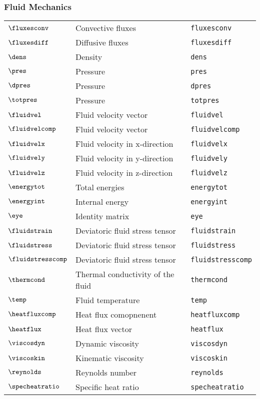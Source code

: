 \subsubsection*{Fluid Mechanics}
\begin{tabular}{l l l}
$\fluxesconv$ & Convective fluxes& \texttt{fluxesconv}\\
$\fluxesdiff$ & Diffusive fluxes& \texttt{fluxesdiff}\\
$\dens$ & Density& \texttt{dens}\\
$\pres$ & Pressure& \texttt{pres}\\
$\dpres$ & Pressure& \texttt{dpres}\\
$\totpres$ & Pressure& \texttt{totpres}\\
$\fluidvel$ & Fluid velocity vector& \texttt{fluidvel}\\
$\fluidvelcomp$ & Fluid velocity vector& \texttt{fluidvelcomp}\\
$\fluidvelx$ & Fluid velocity in x-direction& \texttt{fluidvelx}\\
$\fluidvely$ & Fluid velocity in y-direction& \texttt{fluidvely}\\
$\fluidvelz$ & Fluid velocity in z-direction& \texttt{fluidvelz}\\
$\energytot$ & Total energies& \texttt{energytot}\\
$\energyint$ & Internal energy& \texttt{energyint}\\
$\eye$ & Identity matrix& \texttt{eye}\\
$\fluidstrain$ & Deviatoric fluid stress tensor& \texttt{fluidstrain}\\
$\fluidstress$ & Deviatoric fluid stress tensor& \texttt{fluidstress}\\
$\fluidstresscomp$ & Deviatoric fluid stress tensor& \texttt{fluidstresscomp}\\
$\thermcond$ & Thermal conductivity of the fluid& \texttt{thermcond}\\
$\temp$ & Fluid temperature& \texttt{temp}\\
$\heatfluxcomp$ & Heat flux comopnenent& \texttt{heatfluxcomp}\\
$\heatflux$ & Heat flux vector& \texttt{heatflux}\\
$\viscosdyn$ & Dynamic viscosity& \texttt{viscosdyn}\\
$\viscoskin$ & Kinematic viscosity& \texttt{viscoskin}\\
$\reynolds$ & Reynolds number& \texttt{reynolds}\\
$\specheatratio$ & Specific heat ratio& \texttt{specheatratio}\\

\end{tabular}
